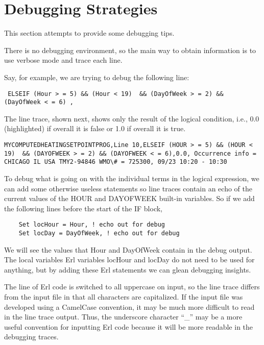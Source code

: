 \section{Debugging Strategies}\label{debugging-strategies}

This section attempts to provide some debugging tips.

There is no debugging environment, so the main way to obtain information is to use verbose mode and trace each line.

Say, for example, we are trying to debug the following line:

\begin{lstlisting}
 ELSEIF (Hour > = 5) && (Hour < 19)  && (DayOfWeek > = 2) && (DayOfWeek < = 6) ,
\end{lstlisting}

The line trace, shown next, shows only the result of the logical condition, i.e., 0.0 (highlighted) if overall it is false or 1.0 if overall it is true.

\begin{lstlisting}
MYCOMPUTEDHEATINGSETPOINTPROG,Line 10,ELSEIF (HOUR > = 5) && (HOUR < 19)  && (DAYOFWEEK > = 2) && (DAYOFWEEK < = 6),0.0, Occurrence info = CHICAGO IL USA TMY2-94846 WMO\# = 725300, 09/23 10:20 - 10:30
\end{lstlisting}

To debug what is going on with the individual terms in the logical expression, we can add some otherwise useless statements so line traces contain an echo of the current values of the HOUR and DAYOFWEEK built-in variables. So if we add the following lines before the start of the IF block,

\begin{lstlisting}
    Set locHour = Hour, ! echo out for debug
    Set locDay = DayOfWeek, ! echo out for debug
\end{lstlisting}

We will see the values that Hour and DayOfWeek contain in the debug output. The local variables Erl variables locHour and locDay do not need to be used for anything, but by adding these Erl statements we can glean debugging insights.

The line of Erl code is switched to all uppercase on input, so the line trace differs from the input file in that all characters are capitalized. If the input file was developed using a CamelCase convention, it may be much more difficult to read in the line trace output. Thus, the underscore character ``\_'' may be a more useful convention for inputting Erl code because it will be more readable in the debugging traces.
